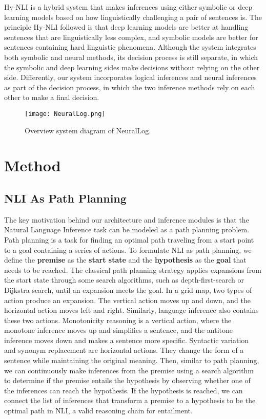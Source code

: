 \documentclass[11pt,a4paper]{article}
\begin{document}
Hy-NLI is a hybrid system that makes inferences using either symbolic or deep learning models based on how linguistically challenging a pair of sentences is. The principle Hy-NLI followed is that deep learning models are better at handling sentences that are linguistically less complex, and symbolic models are better for sentences containing hard linguistic phenomena. Although the system integrates both symbolic and neural methods, its decision process is still separate, in which the symbolic and deep learning sides make decisions without relying on the other side. Differently, our system incorporates logical inferences and neural inferences as part of the decision process, in which the two inference methods rely on each other to make a final decision.  

\begin{figure*}[t!]
    \centering
    \texttt{[image: NeuralLog.png]}
    \caption{Overview system diagram of NeuralLog.}
    \label{fig:neurallog}
\end{figure*}



\section{Method}
\subsection{NLI As Path Planning}
The key motivation behind our architecture and inference modules is that the Natural Language Inference task can be modeled as a path planning problem. Path planning is a task for finding an optimal path traveling from a start point to a goal containing a series of actions. To formulate NLI as path planning, we define the \textbf{premise} as the \textbf{start state} and the \textbf{hypothesis} as the \textbf{goal} that needs to be reached. The classical path planning strategy applies expansions from the start state through some search algorithms, such as depth-first-search or Dijkstra search, until an expansion meets the goal. In a grid map, two types of action produce an expansion. The vertical action moves up and down, and the horizontal action moves left and right.
Similarly, language inference also contains these two actions. Monotonicity reasoning is a vertical action, where the monotone inference moves up and simplifies a sentence, and the antitone inference moves down and makes a sentence more specific. Syntactic variation and synonym replacement are horizontal actions. They change the form of a sentence while maintaining the original meaning. Then, similar to path planning, we can continuously make inferences from the premise using a search algorithm to determine if the premise entails the hypothesis by observing whether one of the inferences can reach the hypothesis. If the hypothesis is reached, we can connect the list of inferences that transform a premise to a hypothesis to be the optimal path in NLI, a valid reasoning chain for entailment.
\end{document}
